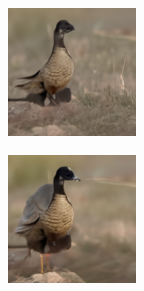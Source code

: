 \documentclass{article}
\begin{document}
\begin{figure}
    \begin{subfigure}[b]{0.5\linewidth}
        \begin{subfigure}[b]{0.242\linewidth}
        \includegraphics[width=\linewidth]{figures/imagenet128/solver_samples/imagenet128_fm_ot_330_05.png}
        \end{subfigure}%
        \begin{subfigure}[b]{0.242\linewidth}
        \includegraphics[width=\linewidth]{figures/imagenet128/solver_samples/imagenet128_fm_ot_330_10.png}

\end{subfigure}
\end{subfigure}
\end{figure}
\end{document}
